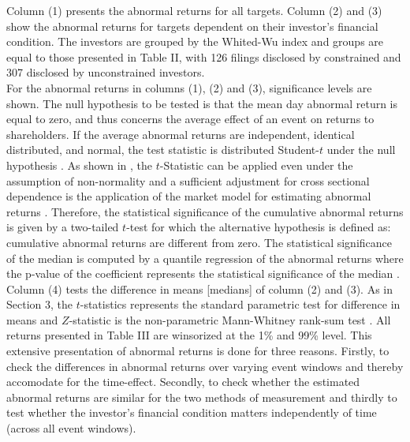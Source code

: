 \documentclass[12pt]{article}
\begin{document}
\noindent Column (1) presents the abnormal returns for all targets. Column (2) and (3) show the abnormal returns for targets dependent on their investor's financial condition. The investors are grouped by the Whited-Wu index and groups are equal to those presented in Table II, with 126 filings disclosed by constrained and 307 disclosed by unconstrained investors.\\
For the abnormal returns in columns (1), (2) and (3), significance levels are shown. The null hypothesis to be tested is that the mean day abnormal return is equal to zero, and thus concerns the average effect of an event on returns to shareholders. If the average abnormal returns are independent, identical distributed, and normal, the test statistic is distributed Student-$t$ under the null hypothesis \citep[p.7]{Brown1985}. As shown in \citet[p.11]{Brown1985}, the $t$-Statistic can be applied even under the assumption of non-normality and a sufficient adjustment for cross sectional dependence is the application of the market model for estimating abnormal returns \citep[p.22]{Brown1985}. Therefore, the statistical significance of the cumulative abnormal returns is given by a two-tailed $t$-test for which the alternative hypothesis is defined as: cumulative abnormal returns are different from zero. The statistical significance of the median is computed by a quantile regression of the abnormal returns where the p-value of the coefficient represents the statistical significance of the median \citep{Ucla}. Column (4) tests the difference in means [medians] of column (2) and (3). As in Section 3, the $t$-statistics represents the standard parametric test for difference in means and $Z$-statistic is the non-parametric Mann-Whitney rank-sum test .
All returns  presented in Table III are winsorized at the 1\% and 99\% level. This extensive presentation of abnormal returns is done for three reasons. Firstly, to check the differences in abnormal returns over varying event windows and thereby accomodate for the time-effect. Secondly, to check whether the estimated abnormal returns are similar for the two methods of measurement and thirdly to test whether the investor's financial condition matters independently of time (across all event windows).
\end{document}
